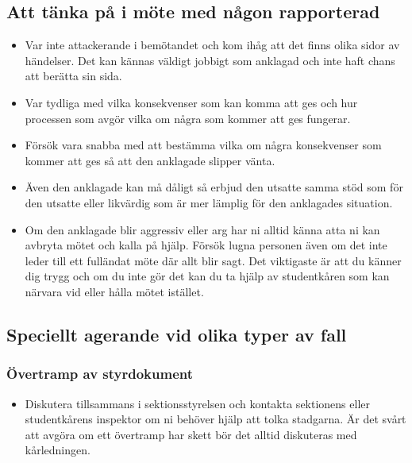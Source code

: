 \documentclass{dtek}
\begin{document}
\subsection{Att tänka på i möte med någon rapporterad}
\begin{itemize}
    \item Var inte attackerande i bemötandet och kom ihåg att det finns olika sidor av händelser. Det kan kännas väldigt jobbigt som anklagad och inte haft chans att berätta sin sida.
    \item Var tydliga med vilka konsekvenser som kan komma att ges och hur processen som avgör vilka om några som kommer att ges fungerar.
    \item Försök vara snabba med att bestämma vilka om några konsekvenser som kommer att ges så att den anklagade slipper vänta.
    \item Även den anklagade kan må dåligt så erbjud den utsatte samma stöd som för den utsatte eller likvärdig som är mer lämplig för den anklagades situation.
    \item Om den anklagade blir aggressiv eller arg har ni alltid känna atta ni kan avbryta mötet och kalla på hjälp. Försök lugna personen även om det inte leder till ett fulländat möte där allt blir sagt. Det viktigaste är att du känner dig trygg och om du inte gör det kan du ta hjälp av studentkåren som kan närvara vid eller hålla mötet istället.
\end{itemize}

\subsection{Speciellt agerande vid olika typer av fall}

\subsubsection{Övertramp av styrdokument}
\begin{itemize}
    \item Diskutera tillsammans i sektionsstyrelsen och kontakta sektionens eller studentkårens inspektor om ni behöver hjälp att tolka stadgarna. Är det svårt att avgöra om ett övertramp har skett bör det alltid diskuteras med kårledningen. 
\end{itemize}
\end{document}
